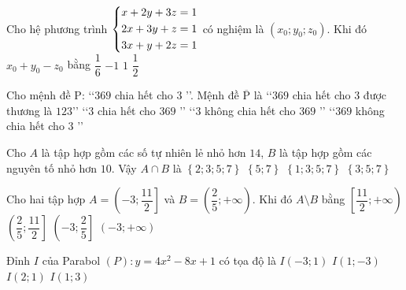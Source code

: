 \begin{ex}%
	Cho hệ phương trình $
	\left\{\begin{aligned}
		&x+2y+3z=1  \\
		&2x+3y+z=1  \\
		&3x+y+2z=1 \end{aligned}\right.$ có nghiệm là $\left( x_0;y_0;z_0\right)$. Khi đó $x_0+y_0-z_0$ bằng
	\choice
	{\True $\dfrac{1}{6}$}
	{$-1$}
	{$1$}
	{$\dfrac{1}{2}$}
\end{ex}

\begin{ex}%
	Cho mệnh đề $\mathrm{P}$: \lq\lq $369$ chia hết cho $3$ \rq \rq. Mệnh đề  $\mathrm{\overline{P}}$ là
	\choice
	{\lq\lq $369$ chia hết cho $3$ được thương là $123$\rq \rq}
	{\lq\lq $3$ chia hết cho $369$ \rq \rq}
	{\lq\lq $3$ không chia hết cho $369$ \rq \rq}
	{\True \lq\lq $369$ không chia hết cho $3$ \rq \rq}
\end{ex}

\begin{ex}%
	Cho $A$ là tập hợp gồm các số tự nhiên lẻ nhỏ hơn $14$, $B$ là tập hợp gồm các nguyên tố nhỏ hơn $10$. Vậy $A\cap B$ là 
	\choice
	{$\left\lbrace {2; 3; 5; 7} \right\rbrace $}
	{$\left\lbrace {5; 7} \right\rbrace $}
	{$\left\lbrace {1; 3; 5; 7} \right\rbrace $}
	{\True $\left\lbrace {3; 5; 7} \right\rbrace $}
\end{ex}

\begin{ex}%
	Cho hai tập hợp $A=\left( -3; \dfrac{11}{2}\right]$ và $B=\left( \dfrac{2}{5};+\infty\right)$. Khi đó $A \setminus B$ bằng
	\choice
	{$\left[\dfrac{11}{2};+\infty \right)$}
	{$\left( \dfrac{2}{5}; \dfrac{11}{2}\right]$}
	{\True $\left( -3; \dfrac{2}{5}\right]$}
	{$\left( -3; +\infty\right)$}
	\loigiai{
		$A \setminus B = \left( -3; \dfrac{2}{5}\right]$		
	}
\end{ex}

\begin{ex}%
	Đỉnh $I$ của Parabol $(P): y=4x^2-8x+1$ có tọa độ là 
	\choice
	{$I(-3;1)$}
	{\True $I(1;-3)$}
	{$I(2;1)$}
	{$I(1;3)$}
\end{ex}

